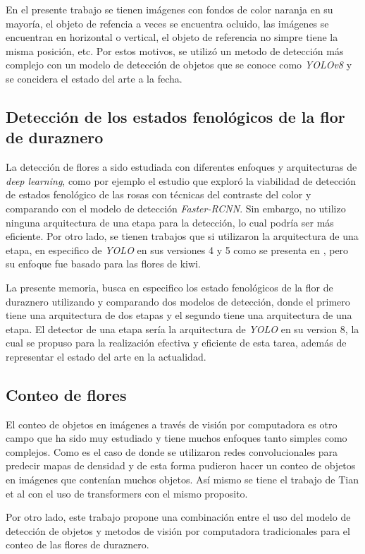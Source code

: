 En el presente trabajo se tienen imágenes con fondos de color naranja en su mayoría, el objeto de refencia a veces se encuentra ocluido, las imágenes se encuentran en horizontal o vertical, el objeto de referencia no simpre tiene la misma posición, etc. Por estos motivos, se utilizó un metodo de detección más complejo con un modelo de detección de objetos que se conoce como \textit{YOLOv8} y se concidera el estado del arte a la fecha.

\subsection{Detección de los estados fenológicos de la flor de duraznero}
 
La detección de flores a sido estudiada con diferentes enfoques y arquitecturas de \textit{deep learning}, como por ejemplo el estudio \cite{ARTICLE:3} que exploró la viabilidad de detección de estados fenológico de las rosas con técnicas del contraste del color y comparando con el modelo de detección \textit{Faster-RCNN}. Sin embargo, no utilizo ninguna arquitectura de una etapa para la detección, lo cual podría ser más eficiente. Por otro lado, se tienen trabajos que si utilizaron la arquitectura de una etapa, en especifico de \textit{YOLO} en sus versiones 4 y 5 como se presenta en \cite{ARTICLE:4} \cite{ARTICLE:5}, pero su enfoque fue basado para las flores de kiwi.

La presente memoria, busca en especifico los estado fenológicos de la flor de duraznero utilizando y comparando dos modelos de detección, donde el primero tiene una arquitectura de dos etapas y el segundo tiene una arquitectura de una etapa. El detector de una etapa sería la arquitectura de \textit{YOLO} en su version 8, la cual se propuso para la realización efectiva y eficiente de esta tarea, además de representar el estado del arte en la actualidad.

\subsection{Conteo de flores}

El conteo de objetos en imágenes a través de visión por computadora es otro campo que ha sido muy estudiado y tiene muchos enfoques tanto simples como complejos. Como es el caso de \cite{ARTICLE:6} donde se utilizaron redes convolucionales para predecir mapas de densidad y de esta forma pudieron hacer un conteo de objetos en imágenes que contenían muchos objetos. Así mismo se tiene el trabajo de Tian et al \cite{ARTICLE:7} con el uso de transformers con el mismo proposito.

Por otro lado, este trabajo propone una combinación entre el uso del modelo de detección de objetos y metodos de visión por computadora tradicionales para el conteo de las flores de duraznero.





